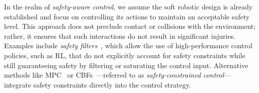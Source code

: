 In the realm of \emph{safety-aware control}, we assume the soft robotic design is already established and focus on controlling its actions to maintain an acceptable safety level. This approach does not preclude contact or collisions with the environment; rather, it ensures that such interactions do not result in significant injuries. Examples include \emph{safety filters}~\citep{bertino2023prescribed}, which allow the use of high-performance control policies, such as \gls{RL}, that do not explicitly account for safety constraints while still guaranteeing safety by filtering or saturating the control input. Alternative methods like \gls{MPC}~\citep{hewing2020learning} or \glspl{CBF}~\citep{ames2016control, ferraguti2020control}—referred to as \emph{safety-constrained control}—integrate safety constraints directly into the control strategy.

